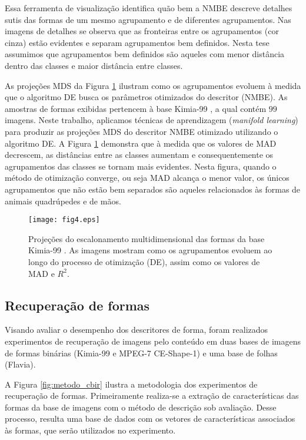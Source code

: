 Essa ferramenta de visualização identifica quão bem a \ac{NMBE} descreve detalhes sutis das formas de um mesmo agrupamento e de diferentes agrupamentos. Nas imagens de detalhes se observa que as fronteiras entre os agrupamentos (cor cinza) estão evidentes e separam agrupamentos bem definidos. Nesta tese assumimos que agrupamentos bem definidos são aqueles com menor distância dentro das classes e maior distância entre classes.  

As projeções \ac{MDS} da Figura \ref{fig:optimization_result} ilustram como os agrupamentos evoluem à medida que o algoritmo \ac{DE} busca os parâmetros otimizados do descritor (\ac{NMBE}). As amostras de formas exibidas pertencem à base Kimia-99 \cite{Sebastian:2004}, a qual contém $99$ imagens. Neste trabalho, aplicamos técnicas de aprendizagem (\textit{manifold learning}) para produzir as projeções \ac{MDS} do descritor \ac{NMBE} otimizado utilizando o algoritmo \ac{DE}.  A Figura \ref{fig:optimization_result} demonstra que à medida que os valores de \ac{MAD} decrescem, as distâncias entre as classes aumentam e consequentemente os agrupamentos das classes se tornam mais evidentes. Nesta figura, quando o método de otimização converge, ou seja \ac{MAD} alcança o menor valor,   os únicos agrupamentos que não estão bem separados são aqueles relacionados às formas de animais quadrúpedes e de mãos.

\begin{figure}[h]
\caption{\label{fig:optimization_result} Projeções do escalonamento multidimensional das formas da base Kimia-99 . As imagens mostram como os agrupamentos evoluem ao longo do processo de otimização (\ac{DE}), assim como os valores de \ac{MAD} e $R^2$.}
\centering
\texttt{[image: fig4.eps]}
\end{figure}

\subsection{Recuperação de formas}

Visando avaliar o desempenho dos descritores de  forma, foram realizados experimentos de recuperação de imagens pelo conteúdo em duas bases de imagens de formas binárias (Kimia-99 e MPEG-7 CE-Shape-1) e uma  base de folhas (Flavia). 

A  Figura \ref{fig:metodo_cbir} ilustra a metodologia dos experimentos de recuperação de formas.  Primeiramente realiza-se a extração de características das formas da base de imagens com o método de descrição sob avaliação. Desse processo, resulta uma base de dados com os vetores de características associados às formas, que serão utilizados no experimento. 

